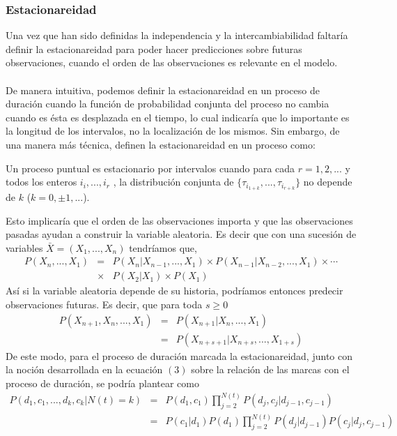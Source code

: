 \subsubsection{Estacionareidad}
Una vez que han sido definidas la independencia y la intercambiabilidad faltar\'ia definir la estacionareidad para poder hacer predicciones sobre futuras observaciones, cuando el orden de las observaciones es relevante en el modelo.\\
\\
De manera intuitiva, podemos definir la estacionareidad en un proceso de duraci\'on cuando la funci\'on de probabilidad conjunta del proceso no cambia cuando es \'esta es desplazada en el tiempo, lo cual indicar\'ia que lo importante es la longitud de los intervalos, no la localizaci\'on de los mismos. Sin embargo, de una manera m\'as t\'ecnica, \cite{daley2003} definen la estacionareidad en un proceso como:
\begin{defi}
Un proceso puntual es estacionario por intervalos cuando para cada $r=1,2,...$ y todos los enteros $i_i,...,i_r$ , la distribuci\'on conjunta de $\{\tau_{i_{1+k}},...,\tau_{i_{r+k}}\}$ no depende de $k$ ($k=0, \pm 1, ...$).
\end{defi}
Esto implicar\'ia que el orden de las observaciones importa y que las observaciones pasadas ayudan a construir la variable aleatoria. Es decir que con una sucesi\'on de variables $\bar{X}=(X_1,...,X_n)$ tendr\'iamos que,
\begin{eqnarray*}
P(X_n,...,X_1)&=&P(X_n|X_{n-1},...,X_1)\times P(X_{n-1}|X_{n-2},...,X_1)\times \cdots\\
               &\times& P(X_2|X_1)\times P(X_1)
\end{eqnarray*}	
As\'i si la variable aleatoria depende de su historia, podr\'iamos entonces predecir observaciones futuras. Es decir, que para toda $s \geq 0$
\begin{eqnarray*}
P(X_{n+1},X_n,...,X_1)&=&P(X_{n+1}|X_n,...,X_1)\\
                      &=&P(X_{n+s+1}|X_{n+s},...,X_{1+s}) \nonumber
\end{eqnarray*}
De este modo, para el proceso de duraci\'on marcada la estacionareidad, junto con la noci\'on desarrollada en la ecuaci\'on $(3)$ sobre la relaci\'on de las marcas con el proceso de duraci\'on, se podr\'ia plantear como
\begin{eqnarray*}
P(d_1,c_1,...,d_k,c_k|N(t)=k)&=&P(d_1,c_1)\prod_{j=2}^{N(t)} P(d_j,c_j|d_{j-1},c_{j-1})\\
                             &=&P(c_1|d_1)P(d_1) \prod_{j=2}^{N(t)} P(d_j|d_{j-1})P(c_j|d_j,c_{j-1}) 
\end{eqnarray*}
